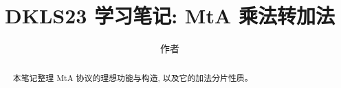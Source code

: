 \documentclass{llncs}
\title{DKLS23 学习笔记: MtA 乘法转加法}
\author{作者}
\institute{某单位}
\begin{document}
\maketitle

\begin{abstract}
本笔记整理 MtA 协议的理想功能与构造, 以及它的加法分片性质。
\end{abstract}


\end{document}
